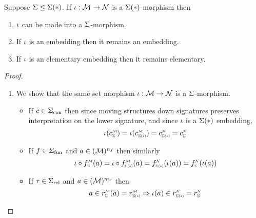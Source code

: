 \begin{prop}
    Suppose $\Sigma \leq \Sigma(*)$.
    If $\iota : \mathcal{M} \to \mathcal{N}$ is a $\Sigma(*)$-morphism then 
    \begin{enumerate}
        \item $\iota$ can be made into a $\Sigma$-morphism.
        \item If $\iota$ is an embedding then it remains an embedding.
        \item If $\iota$ is an elementary embedding then it remains elementary. 
    \end{enumerate}
\end{prop}
\begin{proof}
    \begin{enumerate}
        \item {}
            We show that the same set morphism 
            $\iota : {\mathcal{M}} \to {\mathcal{N}}$
            is a $\Sigma$-morphism.
            \begin{itemize}
                \item If $c \in {\Sigma}_\mathrm{con}$ then since moving structures down
                    signatures preserves interpretation on the lower signature,
                    and since $\iota$ is a $\Sigma(*)$ embedding,
                    \[
                        \io(\subintp{\Si}{\MM}{c}) 
                        = \io(\subintp{\Si(*)}{\MM}{c})
                        = \subintp{\Si(*)}{\NN}{c}
                        = \subintp{\Si}{\NN}{c}
                    \]
                \item If $f \in {\Sigma}_\mathrm{fun}$ and $a \in ({\mathcal{M}})^{n_f}$ 
                    then similarly
                    \[
                        \io \circ \subintp{\Si}{\MM}{f}(a)
                        = \io \circ \subintp{\Si(*)}{\MM}{f}(a)
                        = \subintp{\Si(*)}{\NN}{f}(\io(a))
                        = \subintp{\Si}{\NN}{f}(\io(a))
                    \]
                \item If $r \in {\Sigma}_\mathrm{rel}$ and $a \in ({\mathcal{M}})^{m_r}$
                    then 
                    \[
                        a \in \subintp{\Si}{\MM}{r}(a)
                        = \subintp{\Si(*)}{\MM}{r}
                        \implies \io(a)  \in \subintp{\Si(*)}{\NN}{r}
                        = \subintp{\Si}{\NN}{r}
                    \]
            \end{itemize}

\end{enumerate}
\end{proof}
